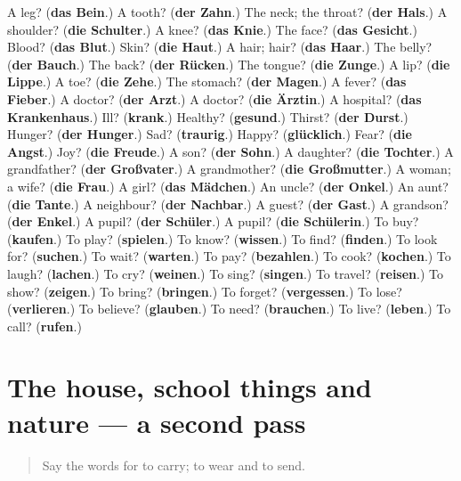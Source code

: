 \begin{tcolorbox}[breakable,colback=teal!4,colframe=teal!35!black,title={Before you move on}]
A leg? (\textbf{das Bein}.) A tooth? (\textbf{der Zahn}.) The neck; the throat? (\textbf{der Hals}.) A shoulder? (\textbf{die Schulter}.) A knee? (\textbf{das Knie}.) The face? (\textbf{das Gesicht}.) Blood? (\textbf{das Blut}.) Skin? (\textbf{die Haut}.) A hair; hair? (\textbf{das Haar}.) The belly? (\textbf{der Bauch}.) The back? (\textbf{der Rücken}.) The tongue? (\textbf{die Zunge}.) A lip? (\textbf{die Lippe}.) A toe? (\textbf{die Zehe}.) The stomach? (\textbf{der Magen}.) A fever? (\textbf{das Fieber}.) A doctor? (\textbf{der Arzt}.) A doctor? (\textbf{die Ärztin}.) A hospital? (\textbf{das Krankenhaus}.) Ill? (\textbf{krank}.) Healthy? (\textbf{gesund}.) Thirst? (\textbf{der Durst}.) Hunger? (\textbf{der Hunger}.) Sad? (\textbf{traurig}.) Happy? (\textbf{glücklich}.) Fear? (\textbf{die Angst}.) Joy? (\textbf{die Freude}.) A son? (\textbf{der Sohn}.) A daughter? (\textbf{die Tochter}.) A grandfather? (\textbf{der Großvater}.) A grandmother? (\textbf{die Großmutter}.) A woman; a wife? (\textbf{die Frau}.) A girl? (\textbf{das Mädchen}.) An uncle? (\textbf{der Onkel}.) An aunt? (\textbf{die Tante}.) A neighbour? (\textbf{der Nachbar}.) A guest? (\textbf{der Gast}.) A grandson? (\textbf{der Enkel}.) A pupil? (\textbf{der Schüler}.) A pupil? (\textbf{die Schülerin}.) To buy? (\textbf{kaufen}.) To play? (\textbf{spielen}.) To know? (\textbf{wissen}.) To find? (\textbf{finden}.) To look for? (\textbf{suchen}.) To wait? (\textbf{warten}.) To pay? (\textbf{bezahlen}.) To cook? (\textbf{kochen}.) To laugh? (\textbf{lachen}.) To cry? (\textbf{weinen}.) To sing? (\textbf{singen}.) To travel? (\textbf{reisen}.) To show? (\textbf{zeigen}.) To bring? (\textbf{bringen}.) To forget? (\textbf{vergessen}.) To lose? (\textbf{verlieren}.) To believe? (\textbf{glauben}.) To need? (\textbf{brauchen}.) To live? (\textbf{leben}.) To call? (\textbf{rufen}.)
\end{tcolorbox}
\section[(dialogue)]{The house, school things and nature — a second pass}

\label{lesson:GE-R79-second-pass-the-house-school-things-and-nature}



\begin{quote}
Say the words for to carry; to wear and to send.
\end{quote}

